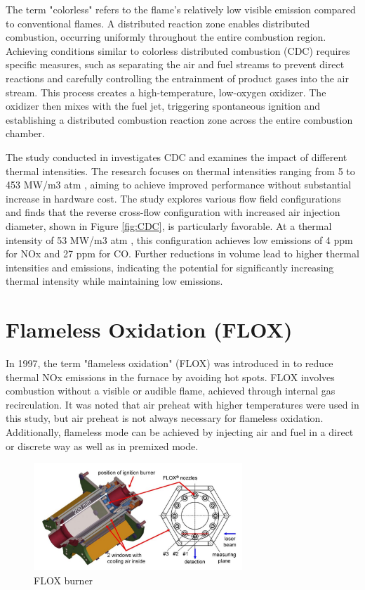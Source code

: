  The term "colorless" refers to the flame's relatively low visible emission compared to conventional flames\cite{ARGHODE201129}. A distributed reaction zone enables distributed combustion, occurring uniformly throughout the entire combustion region. Achieving conditions similar to colorless distributed combustion (CDC) requires specific measures, such as separating the air and fuel streams to prevent direct reactions and carefully controlling the entrainment of product gases into the air stream. This process creates a high-temperature, low-oxygen oxidizer\cite{ARGHODE201129}. The oxidizer then mixes with the fuel jet, triggering spontaneous ignition and establishing a distributed combustion reaction zone across the entire combustion chamber\cite{ARGHODE201129}.

The study conducted in \cite{ARGHODE2013930} investigates CDC and examines the impact of different thermal intensities. The research focuses on thermal intensities ranging from 5 to 453 MW/m3 atm \cite{VAThesis2011}, aiming to achieve improved performance without substantial increase in hardware cost. The study explores various flow field configurations and finds that the reverse cross-flow configuration with increased air injection diameter, shown in Figure \ref{fig:CDC}, is particularly favorable. At a thermal intensity of 53 MW/m3 atm \cite{VAThesis2011}, this configuration achieves low emissions of 4 ppm for NOx and 27 ppm for CO. Further reductions in volume lead to higher thermal intensities and emissions, indicating the potential for significantly increasing thermal intensity while maintaining low emissions.
 
\section{Flameless Oxidation (FLOX)}
In 1997, the term "flameless oxidation" (FLOX) was introduced in \cite{WUNNING199781} to reduce thermal NOx emissions in the furnace by avoiding hot spots. FLOX involves combustion without a visible or audible flame, achieved through internal gas recirculation. It was noted that air preheat with higher temperatures were used in this study, but air preheat is not always necessary for flameless oxidation. Additionally, flameless mode can be achieved by injecting air and fuel in a direct or discrete way as well as in premixed mode.

\begin{figure}[!h]
    \centering    
    \includegraphics[width=0.7\textwidth]{Chapter2/Images/FLOX.jpeg}
    \caption[FLOX burner]{FLOX burner \cite{LAMMEL4001825}}
    \label{fig:FLOX}
\end{figure}

